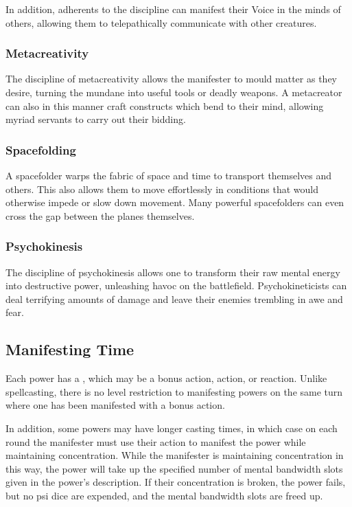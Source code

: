 In addition, adherents to the discipline can manifest their Voice
in the minds of others, allowing them to telepathically
communicate with other creatures.

\subsubsection{Metacreativity}
The discipline of metacreativity allows the manifester to mould
matter as they desire,
turning the mundane into useful tools or deadly weapons.
A metacreator can also in this manner craft constructs
which bend to their mind,
allowing myriad servants to carry out their bidding.

\subsubsection{Spacefolding}
A spacefolder warps the fabric of space and time to
transport themselves and others.
This also allows them to move effortlessly in conditions
that would otherwise impede or slow down movement. 
Many powerful spacefolders can even cross the gap between
the planes themselves.

\subsubsection{Psychokinesis}
The discipline of psychokinesis allows one to transform
their raw mental energy into destructive power,
unleashing havoc on the battlefield.
Psychokineticists can deal terrifying amounts of damage
and leave their enemies trembling in awe and fear.

\subsection{Manifesting Time}
Each power has a ,
which may be a bonus action, action, or reaction.
Unlike spellcasting,
there is no level restriction to manifesting powers
on the same turn where one has been manifested
with a bonus action. 

In addition, some powers may have longer casting times,
in which case on each round the manifester must use their action
to manifest the power while maintaining concentration.
While the manifester is maintaining concentration in this way,
the power will take up the specified number
of mental bandwidth slots given in the power's description.
If their concentration is broken, the power fails,
but no psi dice are expended,
and the mental bandwidth slots are freed up.

